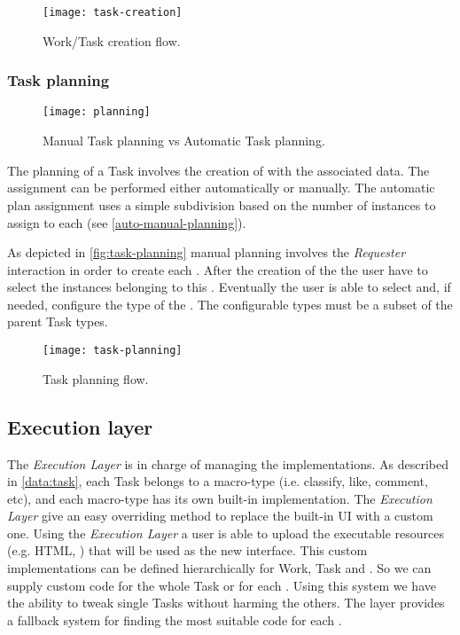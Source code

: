 \begin{figure}[htb]
    \centering
    \texttt{[image: task-creation]}
    \caption{Work/Task creation flow.}
    \label{fig:task-creation}
\end{figure}



\subsubsection{Task planning}
\begin{figure}[htb]
    \centering
    \texttt{[image: planning]}
    \caption{Manual Task planning vs Automatic Task planning.}
    \label{fig:auto-manual-planning}
\end{figure}
The planning of a Task involves the creation of \utask{} with the associated data.
The assignment can be performed either automatically or manually.
The automatic plan assignment uses a simple subdivision based on the
number of instances to assign to each \utask{} (see \autoref{auto-manual-planning}).

As depicted in \autoref{fig:task-planning} manual planning involves the
\emph{Requester} interaction in order to create each \textbf{\utask{}}.
After the creation of the \utask{} the user have to select the instances belonging
to this \utask{}. Eventually the user is able to select and, if needed,
configure the type of the \utask{}. The configurable types must be a subset of
the parent Task types.
\begin{figure}[htb]
    \centering
    \texttt{[image: task-planning]}
    \caption{Task planning flow.}
    \label{fig:task-planning}
\end{figure}























\subsection{Execution layer}\label{sec:exec-layer}
The \emph{Execution Layer} is in charge of managing the \utask{} implementations.
As described in \ref{data:task}, each Task belongs to a macro-type (i.e.
classify, like, comment, etc), and each macro-type  has its own built-in
implementation. The \emph{Execution Layer} give an easy overriding method to
replace the built-in UI with a custom one.
Using the \emph{Execution Layer} a user is able to upload the executable resources
(e.g. HTML, \js{}) that will be used as the new interface.
This custom implementations can be defined hierarchically for Work, Task
and \utask{}. So we can supply custom code for the whole Task or
for each \utask{}. Using this system we have the ability to tweak single
Tasks without harming the others. The layer provides a fallback
system for finding the most suitable code for each \utask{}.

